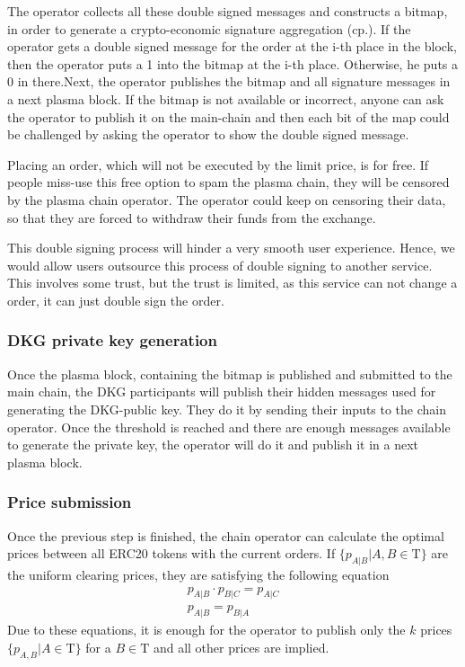 \documentclass[11pt,parskip=full]{scrartcl}%
\newcommand{\Tau}{\mathrm{T}}
\begin{document}
The operator collects all these double signed messages and constructs a bitmap, in order to generate a crypto-economic signature aggregation (cp.\cite{sig}).
If the operator gets a double signed message for the order at the i-th place in the block, then the operator puts a 1 into the bitmap at the i-th place.
Otherwise, he puts a 0 in there.Next, the operator publishes the bitmap and all signature messages in a next plasma block.
If the bitmap is not available or incorrect, anyone can ask the operator to publish it on the main-chain and then each bit of the map could be challenged by asking the operator to show the double signed message.

Placing an order, which will not be executed by the limit price, is for free.
If people miss-use this free option to spam the plasma chain, they will be censored by the plasma chain operator.
The operator could keep on censoring their data, so that they are forced to withdraw their funds from the exchange.

This double signing process will hinder a very smooth user experience.
Hence, we would allow users outsource this process of double signing to another service.
This involves some trust, but the trust is limited, as this service can not change a order, it can just double sign the order.

\subsubsection{DKG private key generation}
Once the plasma block, containing the bitmap is published and submitted to the main chain, the DKG participants will publish their hidden messages used for generating the DKG-public key.
They do it by sending their inputs to the chain operator.
Once the threshold is reached and there are enough messages available to generate the private key, the operator will do it and publish it in a next plasma block.

\subsubsection{Price submission}
Once the previous step is finished, the chain operator can calculate the optimal prices between all ERC20 tokens with the current orders.
If $\{p_{A|B}| A,B \in \Tau \}$  are the uniform clearing prices, they are satisfying the following equation
\begin{align}
    \label{eq:arbitrage_freeness}
  p_{A|B} \cdot p_{B|C} = p_{A|C}\\
  p_{A|B} = p_{B|A}
\end{align}
Due to these equations, it is enough for the operator to publish only the $k$ prices $\{p_{A,B}| A \in \Tau \}$ for a $B\in \Tau$ and all other prices are implied.
\end{document}
